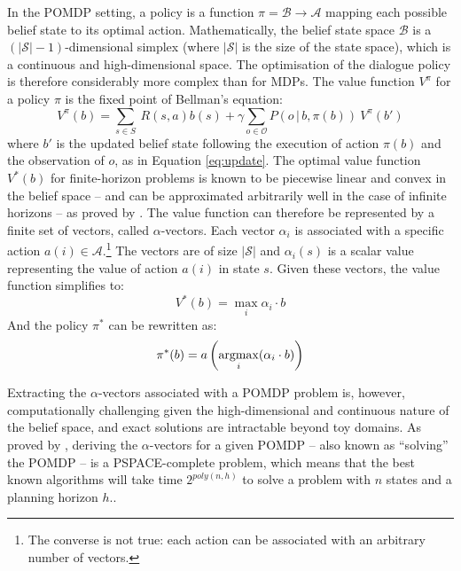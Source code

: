 In the POMDP setting, a policy is a function $\pi = \mathcal{B} \rightarrow \mathcal{A}$ mapping each possible belief state to its optimal action.  Mathematically, the belief state space $\mathcal{B}$ is a $(|\mathcal{S}|\!-\!1)$-dimensional simplex (where $|\mathcal{S}|$ is the size of the state space), which is a continuous and high-dimensional space. The optimisation of the dialogue policy is therefore considerably more complex than for MDPs. The value function $V^{\pi}$ for a policy $\pi$ is the fixed point of Bellman's equation: 
\begin{equation}
V^{\pi}(b) = \sum_{s \in S} \ R(s,a) b(s) + \gamma \sum_{o \in \mathcal{O}} P(o\, |\, b,\pi(b)) \ V^{\pi}(b')
\end{equation}
where $b'$ is the updated belief state following the execution of action $\pi(b)$ and the observation of $o$, as in Equation \eqref{eq:update}.  The optimal value function $V^*(b)$ for finite-horizon problems is known to be piecewise linear and convex in the belief space -- and can be approximated arbitrarily well in the case of infinite horizons -- as proved by \cite{Sondik1971}. The value function can therefore be represented by a finite set of vectors, called $\alpha$-vectors. Each vector $\alpha_i$ is associated with a specific action $a(i) \in \mathcal{A}$.\footnote{The converse is not true: each action can be associated with an arbitrary number of vectors.}  The vectors are of size $|\mathcal{S}|$ and $\alpha_i(s)$ is a scalar value representing the value of action $a(i)$ in state $s$.  Given these vectors, the value function simplifies to:
\begin{equation}
V^*(b) = \max_{i} \alpha_i \cdot b
\end{equation}
And the policy $\pi^*$ can be rewritten as:
\begin{equation}
\pi^*(b) = a\left(\argmax_i(\alpha_i \cdot b)\right)
\end{equation}

Extracting the $\alpha$-vectors associated with a POMDP problem is, however, computationally challenging given the high-dimensional and continuous nature of the belief space, and exact solutions are intractable beyond toy domains. As proved by \cite{Papadimitriou:1987}, deriving the $\alpha$-vectors for a given POMDP -- also known as ``solving'' the POMDP -- is a PSPACE-complete problem, which means that the best known algorithms will take time $2^{poly(n,h)}$ to solve a problem with $n$ states and a planning horizon $h$..

